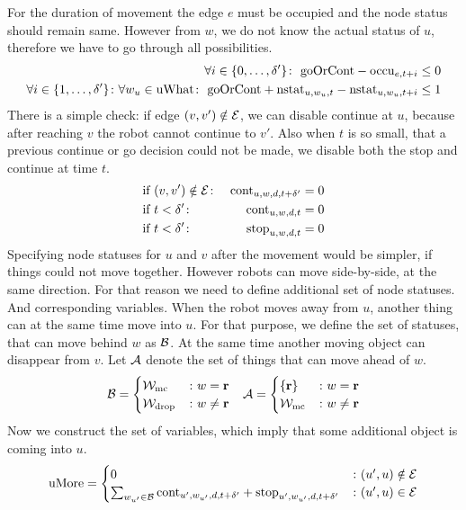 For the duration of movement the edge $e$ must be occupied and the node status
should remain same. However from $w$, we do not know the actual status of $u$,
therefore we have to go through all possibilities.
\begin{align}
    \forall i \in \{0,\ldots,\td'\}\colon \  \goOrCont - \occu_{e,t+i} &\leq 0\\
    \forall i \in \{1,\ldots,\td'\}\colon \forall w_u \in \uw\colon \ \goOrCont
    + \nstat_{u,w_u,t} - \nstat_{u,w_u,t+i} &\leq 1
\end{align}
There is a simple check: if edge $(v,v') \notin \mathcal{E}$, we can disable continue at
$u$, because after reaching $v$ the robot cannot continue to $v'$. Also when
$t$ is so small, that a previous continue or go decision could not be made, we
disable both the stop and continue at time $t$.
\begin{align}
    &\text{if}\ (v,v') \notin \mathcal{E} \colon &\mathrm{cont}_{u,w,d,t+\delta'} = 0\\
    &\text{if}\ t < \delta' \colon &\mathrm{cont}_{u,w,d,t} = 0\\
    &\text{if}\ t < \delta' \colon &\mathrm{stop}_{u,w,d,t} = 0
\end{align}
Specifying node statuses for $u$ and $v$ after the movement would be simpler,
if things could not move together. However robots can move side-by-side, at the
same direction. For that reason we need to define additional set of node
statuses. And corresponding variables. When the robot moves away from $u$,
another thing can at the same time move into $u$. For that purpose, we define
the set of statuses, that can move behind $w$ as $\mathcal{B}$. At the same time another
moving object can disappear from $v$. Let $\mathcal{A}$ denote the set of things that
can move ahead of $w$.
\begin{align}
    &\mathcal{B} = \begin{cases}
        \mathcal{W}_\mathrm{mc} &\colon w = \text{\bf r}\\
        \mathcal{W}_\mathrm{drop} &\colon w \neq \text{\bf r}
    \end{cases}
    &\mathcal{A} = \begin{cases}
        \{\text{\bf r}\} &\colon w = \text{\bf r}\\
        \mathcal{W}_\mathrm{mc} &\colon w \neq \text{\bf r}
    \end{cases}
\end{align}
Now we construct the set of variables, which imply that some additional object
is coming into $u$.
\begin{align}
    \mathrm{uMore} = \begin{cases}
        0 &\colon (u',u) \notin \mathcal{E}\\
        \sum_{w_{u'} \in \mathcal{B}} \mathrm{cont}_{u',w_{u'},d,t+\delta'} +
        \mathrm{stop}_{u',w_{u'},d,t+\delta'} &\colon (u',u) \in \mathcal{E}
    \end{cases}
\end{align}
